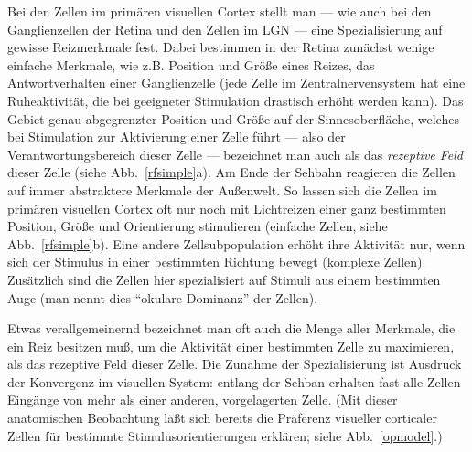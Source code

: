 Bei den Zellen im primären visuellen Cortex stellt man --- wie auch bei
den Ganglienzellen der Retina und den Zellen im LGN --- eine
Spezialisierung auf gewisse Reizmerkmale fest. Dabei bestimmen in der
Retina zunächst wenige einfache Merkmale, wie z.B. Position und Größe
eines Reizes, das Antwortverhalten einer Ganglienzelle (jede Zelle im
Zentralnervensystem hat eine Ruheaktivität, die bei geeigneter Stimulation
drastisch erhöht werden kann). Das Gebiet genau abgegrenzter Position und
Größe auf der Sinnesoberfläche, welches bei Stimulation zur Aktivierung
einer Zelle führt --- also der Verantwortungsbereich dieser Zelle ---
bezeichnet man auch als das \emph{rezeptive Feld} dieser Zelle (siehe
Abb.~\ref{rfsimple}a). Am Ende der Sehbahn reagieren die Zellen auf immer
abstraktere Merkmale der Außenwelt. So lassen sich die Zellen im
primären visuellen Cortex oft nur noch mit Lichtreizen einer ganz
bestimmten Position, Größe und Orientierung stimulieren (einfache Zellen,
siehe Abb.~\ref{rfsimple}b). Eine andere Zellsubpopulation erhöht ihre
Aktivität nur, wenn sich der Stimulus in einer bestimmten Richtung bewegt
(komplexe Zellen). Zusätzlich sind die Zellen hier spezialisiert auf
Stimuli aus einem bestimmten Auge (man nennt dies ``okulare Dominanz'' der
Zellen).

Etwas verallgemeinernd bezeichnet man oft auch die Menge aller Merkmale,
die ein Reiz besitzen muß, um die Aktivität einer bestimmten Zelle zu
maximieren, als das rezeptive Feld dieser Zelle. Die Zunahme der
Spezialisierung ist Ausdruck der Konvergenz im visuellen System: entlang
der Sehban erhalten fast alle Zellen Eingänge von mehr als einer anderen,
vorgelagerten Zelle. (Mit dieser anatomischen Beobachtung läßt sich
bereits die Präferenz visueller corticaler Zellen für bestimmte
Stimulusorientierungen erklären; siehe Abb.~\ref{opmodel}.)


